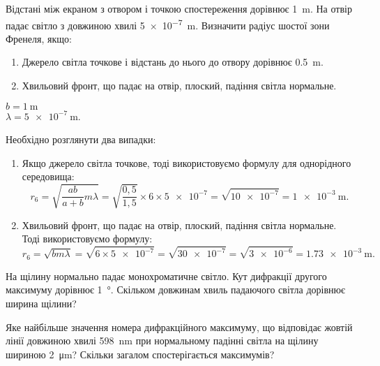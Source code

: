 \documentclass[a4paper,oneside,DIV=10,12pt]{scrartcl}
\newcommand{\given}[1]{\begin{trivlist}\item[\hskip \labelsep\textbf{Дано:}]#1\end{trivlist}}
\begin{document}
	\begin{exercise}
		Відстані між екраном з отвором і точкою спостереження дорівнює \SI{1}{\metre}. На отвір падає світло з довжиною хвилі \SI{5e-7}{\metre}. Визначити радіус шостої зони Френеля, якщо:
		\begin{enumerate}
			\item Джерело світла точкове і відстань до нього до отвору дорівнює \SI{0.5}{\metre}.
			\item Хвильовий фронт, що падає на отвір, плоский, падіння світла нормальне.
		\end{enumerate}
	\end{exercise}
	
	\begin{solution}
		\given{$b = \SI{1}{\metre}$\\
		$\lambda = \SI{5e-7}{\metre}$.}
			
			
	
		Необхідно розглянути два випадки:
		\begin{enumerate}
			\item Якщо джерело світла точкове, тоді використовуємо формулу для однорідного середовища:
			\[
				r_6 = \sqrt{\frac{ab}{a+b} m \lambda}
				    = \sqrt{\frac{0{,}5}{1{,}5}} \times 6 \times \num{5e-7}
					= \sqrt{\num{10e-7}} = \SI{1e-3}{\metre}.
			\]
			
			\item Хвильовий фронт, що падає на отвір, плоский, падіння світла нормальне. Тоді використовуємо формулу:
			\[
				r_6 = \sqrt{b m \lambda}
				    = \sqrt{6 \times \num{5e-7}}
					= \sqrt{\num{30e-7}}
					= \sqrt{\num{3e-6}}
					= \SI{1.73e-3}{\metre}.
			\]
		\end{enumerate}
		
	\end{solution}
	
	\begin{exercise}
		На щілину нормально падає монохроматичне світло. Кут дифракції другого максимуму дорівнює \SI{1}{\degree}. Скільком довжинам хвиль падаючого світла дорівнює ширина щілини?
	\end{exercise}
	
	\begin{solution}
	\end{solution}
	
	\begin{exercise}
		Яке найбільше значення номера дифракційного максимуму, що відповідає жовтій лінії довжиною хвилі \SI{598}{\nano\metre} при нормальному падінні світла на щілину шириною \SI{2}{\micro\metre}? Скільки загалом спостерігається максимумів?
	\end{exercise}
	
\end{document}
